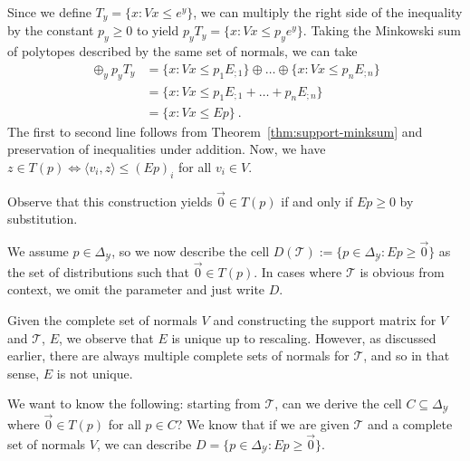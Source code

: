 \documentclass[anon]{colt2020} %
\newcommand{\simplex}{\Delta_\Y}
\newcommand{\T}{\mathcal{T}}
\newcommand{\Y}{\mathcal{Y}}
\newcommand{\inprod}[2]{\langle #1, #2 \rangle}%
\begin{document}
Since we define $T_y = \{x : Vx \leq e^y\}$, we can multiply the right side of the inequality by the constant $p_y \geq  0$ to yield $p_y T_y = \{x : Vx \leq p_y e^y\}$.
Taking the Minkowski sum of polytopes described by the same set of normals, we can take 
\begin{align*}
\oplus_y p_y T_y &= \{x : Vx \leq p_1 E_{;1}\} \oplus \ldots \oplus \{x : Vx \leq p_n E_{;n}\} \\
&= \{x : Vx \leq p_1 E_{;1} + \ldots + p_n E_{;n}\}\\
&= \{x : Vx \leq E p\}~.~
\end{align*}
The first to second line follows from Theorem~\ref{thm:support-minksum} and preservation of inequalities under addition.
Now, we have $z \in T(p) \iff \inprod{v_i}{z} \leq (Ep)_i$ for all $v_i \in V$.

Observe that this construction yields $\vec 0 \in T(p)$ if and only if $E p \geq 0$ by substitution.  

We assume $p \in \simplex$, so we now describe the cell $D(\T) := \{p \in \simplex : Ep \geq \vec 0\}$ as the set of distributions such that $\vec 0 \in T(p)$.
In cases where $\T$ is obvious from context, we omit the parameter and just write $D$.

Given the complete set of normals $V$ and constructing the support matrix for $V$ and $\T$, $E$, we observe that $E$ is unique up to rescaling.
However, as discussed earlier, there are always multiple complete sets of normals for $\T$, and so in that sense, $E$ is not unique.


We want to know the following: starting from $\T$, can we derive the cell $C \subseteq \simplex$ where $\vec 0 \in T(p)$ for all $p \in C$?
We know that if we are given $\T$ and a complete set of normals $V$, we can describe $D = \{p \in \simplex : Ep \geq \vec 0\}$.
\end{document}
